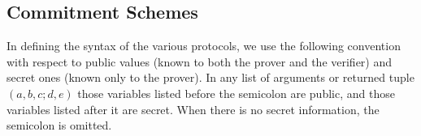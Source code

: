 

\subsection{Commitment Schemes}

In defining the syntax of the various protocols, we use the following convention with respect to public values (known to both the prover and the verifier) and secret ones (known only to the prover). In any list of arguments or returned tuple $(a, b, c; d, e)$ those variables listed before the semicolon are public, and those variables listed after it are secret. When there is no secret information, the semicolon is omitted.

